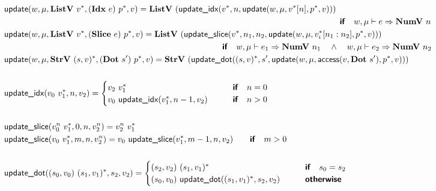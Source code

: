 \begin{align*}
%
\newline \\
  &\update(w, \mu, \listv ~ \seq{v}, (\idxp ~ e) ~ \seq{p}, v) =
  \listv ~ (\updateidx(\seq v, n, \update(w, \mu, \seq{v}[n], \seq{p}, v))) \\
  &\qquad\qquad\qquad\qquad\qquad\qquad\qquad\qquad\qquad\qquad\qquad\qquad\qquad\qquad\qquad\qquad\qquad\qquad\qquad\qquad\premise{if}\quad
  w, \mu \vdash e \Rightarrow \numv ~ n \\
  &\update(w, \mu, \listv ~ \seq{v}, (\slicep ~ e) ~ \seq{p}, v) =
  \listv ~ (\updateslice(\seq v, n_1, n_2, \update(w, \mu, \seq{v_i}[n_1: n_2], \seq{p}, v))) \\
  &\qquad\qquad\qquad\qquad\qquad\qquad\qquad\qquad\qquad\qquad\qquad\qquad\qquad\premise{if}\quad
  w, \mu \vdash e_1 \Rightarrow \numv ~ n_1 \quad\land\quad
  w, \mu \vdash e_2 \Rightarrow \numv ~ n_2 \\
  &\update(w, \mu, \strv ~ \seq{(s, v)}, (\dotp ~ s') ~ \seq{p}, v)
  =
  \strv ~ (\updatedot(\seq{(s, v)}, s', \update(w, \mu, \access(v, \dotp ~ s'), \seq{p}, v))) \\
%
\newline \\
  &\updateidx(v_0 ~ \seq{v_1}, n, v_2) =
  \begin{cases}
    v_2 ~ \seq{v_1}
    &\quad\quad\premise{if}\quad n = 0 \\
    v_0 ~ \updateidx(\seq{v_1}, n-1, v_2)
    &\quad\quad\premise{if}\quad n > 0 \\
  \end{cases} \\
%
\newline \\
  &\updateslice(v_0^n ~ \seq{v_1}, 0, n, v_2^n) = v_2^n ~ \seq{v_1} \\
  &\updateslice(v_0 ~ \seq{v_1}, m, n, v_2^n) =  v_0 ~ \updateslice(\seq{v_1}, m-1, n, v_2)
  \quad\quad\premise{if}\quad m > 0 \\
%
\newline \\
  &\updatedot((s_0, v_0) ~ \seq{(s_1, v_1)}, s_2, v_2) =
  \begin{cases}
    (s_2, v_2) ~ \seq{(s_1, v_1)}
    &\quad\quad\premise{if}\quad s_0 = s_2 \\
    (s_0, v_0) ~ \updatedot(\seq{(s_1, v_1)}, s_2, v_2)
    &\quad\quad\premise{otherwise}
  \end{cases}
  \\

\end{align*}
